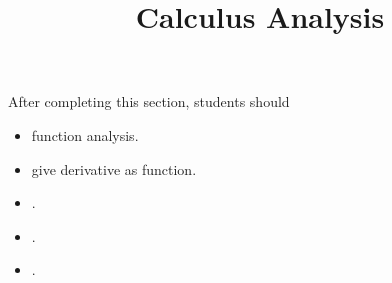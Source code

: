 \documentclass{ximera}
\title{Calculus Analysis}
\begin{document}
\begin{abstract}
\end{abstract}
\maketitle

\begin{sectionOutcomes}
After completing this section, students should 

\begin{itemize}
\item function analysis.
\item give derivative as function.
\item .
\item .
\item .
\end{itemize}
\end{sectionOutcomes}
\end{document}
